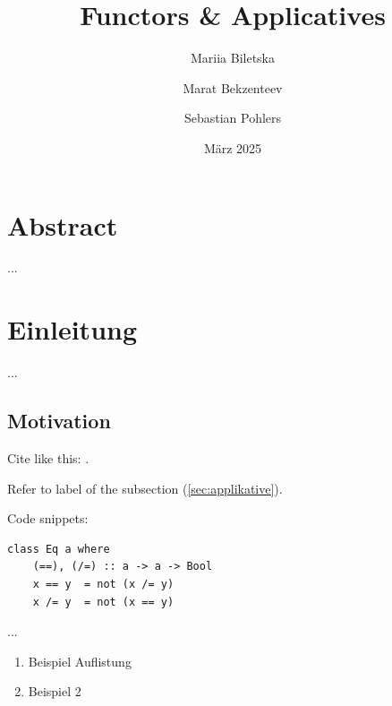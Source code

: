 \documentclass[a4paper, 11pt]{article}
\title{Functors \& Applicatives}
\author{Mariia Biletska \and Marat Bekzenteev \and Sebastian Pohlers}
\date{März 2025}
\begin{document}
\maketitle

\section*{Abstract}

...

\section{Einleitung}

...
\subsection{Motivation}
\label{sec:motivation}

Cite like this: \cite[Kap. Monads and functors]{preludeDoc}.

Refer to label of the subsection (\ref{sec:applikative}).

Code snippets:
\begin{center}
\begin{BVerbatim}
class Eq a where
    (==), (/=) :: a -> a -> Bool
    x == y  = not (x /= y)
    x /= y  = not (x == y)
\end{BVerbatim}
\end{center}

...

\begin{enumerate}
    \item Beispiel Auflistung
    \item Beispiel 2
\end{enumerate}

\printbibliography
\end{document}
